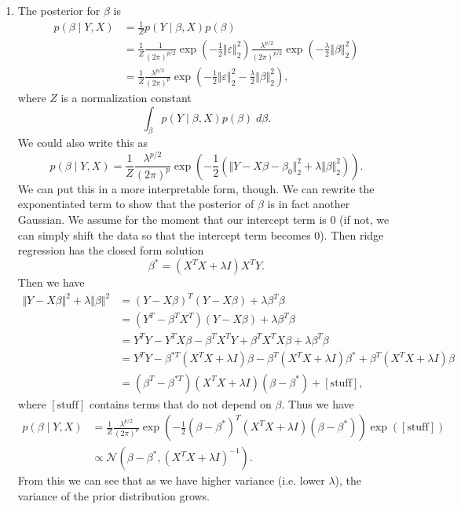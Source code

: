 \documentclass{article}
\begin{document}
\begin{enumerate}
	\item The posterior for $\beta$ is
		\begin{align*}
			p(\beta \;|\; Y,X) &= \frac{1}{Z} p(Y \;|\; \beta,X) p(\beta) \\
					   &= \frac{1}{Z} \frac{1}{(2\pi)^{p/2}} \exp\left( -\frac{1}{2} \Vert{\varepsilon}\Vert_{2}^{2} \right) \frac{\lambda^{p/2}}{(2\pi)^{p/2}} \exp\left( -\frac{\lambda}{2} \Vert{\beta}\Vert_{2}^{2} \right) \\
					   &= \frac{1}{Z} \frac{\lambda^{p/2}}{(2\pi)^p} \exp\left( -\frac{1}{2} \Vert{\varepsilon}\Vert_{2}^{2} -\frac{\lambda}{2}\Vert{\beta}\Vert_{2}^{2} \right),
		\end{align*}
		where $Z$ is a normalization constant
		\[
			\int_{\beta} p(Y \;|\; \beta,X) p(\beta) \;d\beta.
		\] 
		We could also write this as
		\[
			p(\beta \;|\; Y,X) = \frac{1}{Z} \frac{\lambda^{p/2}}{(2\pi)^p} \exp\left( -\frac{1}{2} \left( \Vert{Y-X\beta - \beta_0}\Vert_{2}^{2} +\lambda\Vert{\beta}\Vert_{2}^{2} \right) \right).
		\] 
		We can put this in a more interpretable form, though. We can rewrite the exponentiated term to show that the posterior of $\beta$ is in fact another Gaussian. We assume for the moment that our intercept term is 0 (if not, we can simply shift the data so that the intercept term becomes 0). Then ridge regression has the closed form solution
		\[
			\beta^* = (X^TX+\lambda I)X^TY.
		\] 
		Then we have
		\begin{align*}
			\Vert{Y-X\beta}\Vert^2 + \lambda \Vert{\beta}\Vert^2 &= (Y-X\beta)^T (Y-X\beta) + \lambda \beta^T \beta \\
									     &= (Y^T-\beta^T X^T)(Y-X\beta)+\lambda \beta^T \beta \\
									     &= Y^T Y - Y^T X \beta - \beta^T X^T Y + \beta^T X^T X \beta + \lambda \beta^T \beta \\
									     &= Y^TY - \beta^{*T} (X^TX+\lambda I)\beta - \beta^T (X^TX + \lambda I) \beta^* + \beta^T(X^TX+\lambda I) \beta \\
									     &= (\beta^T - \beta^{*T})(X^TX+\lambda I)(\beta-\beta^*) + [\text{stuff}],
		\end{align*}
		where $[\text{stuff}]$ contains terms that do not depend on $\beta$. Thus we have
		\begin{align*}
			p(\beta \;|\; Y,X) &= \frac{1}{Z} \frac{\lambda^{p/2}}{(2\pi)^p} \exp\left( -\frac{1}{2} (\beta-\beta^*)^T(X^TX+\lambda I)(\beta-\beta^*) \right) \exp([\text{stuff}]) \\
					   &\propto \mathcal{N}(\beta-\beta^*, (X^TX+\lambda I)^{-1}).
		\end{align*}
		From this we can see that as we have higher variance (i.e. lower $\lambda$), the variance of the prior distribution grows.


\end{enumerate}
\end{document}
